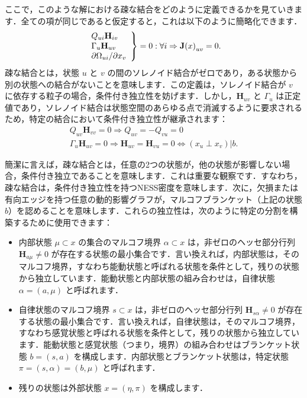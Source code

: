 \documentclass[a4paper, titlepage]{jsarticle}
\begin{document}
ここで，このような解における疎な結合をどのように定義できるかを見ていきます．全ての項が同じであると仮定すると，これは以下のように簡略化できます．
\begin{equation}\label{sparse_coupling}
    \left.
    \begin{array}{l}
        Q_{ui}\mathbf{H}_{iv} \\
        \Gamma_{u}\mathbf{H}_{uv} \\
        \partial\Omega_{ui}/\partial x_v
    \end{array}
    \right\}
    =0:\forall i\Rightarrow\mathbf{J}\qty(x)_{uv}=0.
\end{equation}
疎な結合とは，状態 $u$ と $v$ の間のソレノイド結合がゼロであり，ある状態から別の状態への結合がないことを意味します．この定義は，ソレノイド結合が $v$ に依存する粒子の場合，条件付き独立性を妨げます．しかし，$\mathbf{H}_{uv}$ と $\Gamma_{u}$ は正定値であり，ソレノイド結合は状態空間のあらゆる点で消滅するように要求されるため，特定の結合において条件付き独立性が継承されます：
\begin{equation}
    \begin{aligned}
        Q_{uv}\mathbf{H}_{vv} = 0 \Rightarrow Q_{uv} = -Q_{vu}=0 \\
        \Gamma_{u}\mathbf{H}_{uv} = 0 \Rightarrow \mathbf{H}_{uv}=\mathbf{H}_{vu} = 0 \Leftrightarrow (x_u \perp x_v)|b.
    \end{aligned}
\end{equation}
\par
簡潔に言えば，疎な結合とは，任意の2つの状態が，他の状態が影響しない場合，条件付き独立であることを意味します．これは重要な観察です．すなわち，疎な結合は，条件付き独立性を持つNESS密度を意味します．次に，欠損または有向エッジを持つ任意の動的影響グラフが，マルコフブランケット（上記の状態 $b$）を認めることを意味します．これらの独立性は，次のように特定の分割を構築するために使用できます：
\begin{itemize}
    \item 内部状態 $\mu \subset x$ の集合のマルコフ境界 $\alpha \subset x$ は，非ゼロのヘッセ部分行列 $\mathbf{H}_{a\mu} \neq 0$ が存在する状態の最小集合です．言い換えれば，内部状態は，そのマルコフ境界，すなわち能動状態と呼ばれる状態を条件として，残りの状態から独立しています．能動状態と内部状態の組み合わせは，自律状態 $\alpha = (a, \mu)$ と呼ばれます．
    \item 自律状態のマルコフ境界 $s \subset x$ は，非ゼロのヘッセ部分行列 $\mathbf{H}_{s\alpha} \neq 0$ が存在する状態の最小集合です．言い換えれば，自律状態は，そのマルコフ境界，すなわち感覚状態と呼ばれる状態を条件として，残りの状態から独立しています．能動状態と感覚状態（つまり，境界）の組み合わせはブランケット状態 $b = (s, a)$ を構成します．内部状態とブランケット状態は，特定状態 $\pi = (s, \alpha) = (b, \mu)$ と呼ばれます．
    \item 残りの状態は外部状態 $x = (\eta, \pi)$ を構成します．
\end{itemize}
\end{document}
